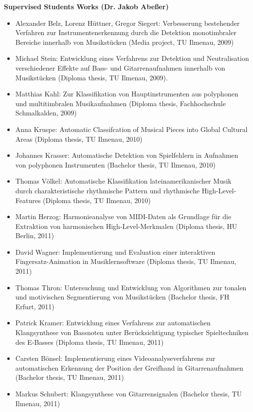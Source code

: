 \documentclass[8pt,a4paper]{article}
\newenvironment{itemizePacked}{
\begin{itemize}
  \setlength{\itemsep}{1pt}
  \setlength{\parskip}{3pt}
  \setlength{\parsep}{0pt}
  \renewcommand{\labelitemi}{$\bullet$}
}{\end{itemize}}
\begin{document}
\pagestyle{empty}


{\bf Supervised Students Works (Dr. Jakob Abe{\ss}er)}
\begin{itemizePacked}
\item Alexander Belz, Lorenz Hüttner, Gregor Siegert: Verbesserung bestehender Verfahren zur Instrumentenerkennung durch die Detektion monotimbraler Bereiche innerhalb von Musikst\"ucken (Media project, TU Ilmenau, 2009)
\item Michael Stein: Entwicklung eines Verfahrens zur Detektion und Neutralisation verschiedener Effekte auf Bass- und Gitarrenaufnahmen innerhalb von Musikst\"ucken (Diploma thesis, TU Ilmenau, 2009). 
\item Matthias Kahl: Zur Klassifikation von Hauptinstrumenten aus polyphonen und multitimbralen Musikaufnahmen (Diploma thesis, Fachhochschule Schmalkalden, 2009)
\item Anna Kruspe: Automatic Classifcation of Musical Pieces into Global Cultural Areas (Diploma thesis, TU Ilmenau, 2010)
\item Johannes Krasser: Automatische Detektion von Spielfehlern in Aufnahmen von polyphonen Instrumenten (Bachelor thesis, TU Ilmenau, 2010)
\item Thomas V\"olkel: Automatische Klassifikation lateinamerikanischer Musik durch charakteristische rhythmische Pattern und rhythmische High-Level-Features (Diploma thesis, TU Ilmenau, 2010)
\item Martin Herzog: Harmonieanalyse von MIDI-Daten als Grundlage f\"ur die Extraktion von harmonischen High-Level-Merkmalen (Diploma thesis, HU Berlin, 2011)
\item David Wagner: Implementierung und Evaluation einer interaktiven Fingersatz-Animation in Musiklernsoftware (Diploma thesis, TU Ilmenau, 2011)
\item Thomas Thron: Untersuchung und Entwicklung von Algorithmen zur tonalen und motivischen Segmentierung von Musikstücken (Bachelor thesis, FH Erfurt, 2011)
\item Patrick Kramer: Entwicklung eines Verfahrens zur automatischen Klangsynthese von Bassnoten unter Ber\"ucksichtigung typischer Spieltechniken des E-Basses (Diploma thesis, TU Ilmenau, 2011)
\item Carsten B\"onsel: Implementierung eines Videoanalyseverfahrens zur automatischen Erkennung der Position der Greifhand in Gitarrenaufnahmen (Bachelor thesis, TU Ilmenau, 2011)
\item Markus Schubert: Klangsynthese von Gitarrensignalen (Bachelor thesis, TU Ilmenau, 2011)

\end{itemizePacked}
\end{document}
